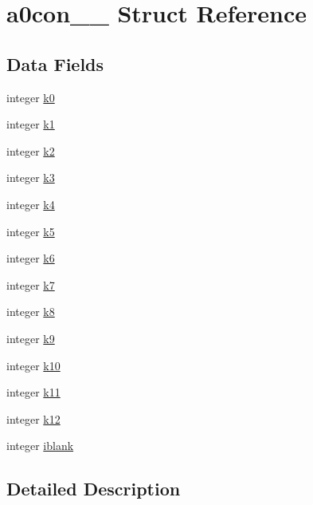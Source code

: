 \hypertarget{structa0con__1__}{}\section{a0con\+\_\+\_\+ Struct Reference}
\label{structa0con__1__}
\subsection*{Data Fields}
\begin{DoxyCompactItemize}
\item 
integer \hyperlink{structa0con__1___a8de587f4fd3743963161a54d352aa45b}{k0}
\item 
integer \hyperlink{structa0con__1___a3e099be2c6bb80173a4054def22b3508}{k1}
\item 
integer \hyperlink{structa0con__1___a21267212a3c28af51ae0427ee16961bb}{k2}
\item 
integer \hyperlink{structa0con__1___a1ca617a8aded2c01162307042bf177d6}{k3}
\item 
integer \hyperlink{structa0con__1___ad293a557a70d975bb6292ff048e5fb0e}{k4}
\item 
integer \hyperlink{structa0con__1___afb868c8c1fa39876198def4d723be2d2}{k5}
\item 
integer \hyperlink{structa0con__1___afc08d6f339d21a9d0d40c9cd71595148}{k6}
\item 
integer \hyperlink{structa0con__1___a7e875036988993ad9870849778d68358}{k7}
\item 
integer \hyperlink{structa0con__1___a53571959fe0c5b79655dc30fe8ae66c7}{k8}
\item 
integer \hyperlink{structa0con__1___a766bebd932f588262f7daa1833d45062}{k9}
\item 
integer \hyperlink{structa0con__1___a7bab7601ddcc4c16b3758df7917fa75a}{k10}
\item 
integer \hyperlink{structa0con__1___a3746a8fa31ae250c18150ce10b0a5ece}{k11}
\item 
integer \hyperlink{structa0con__1___ae7548365e83c840628af8b4c41acd0e6}{k12}
\item 
integer \hyperlink{structa0con__1___a4bb5666fbdb7dce2c7f4fe9ab7faa894}{iblank}
\end{DoxyCompactItemize}


\subsection{Detailed Description}


